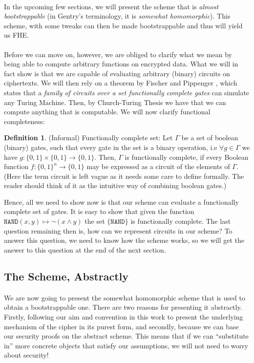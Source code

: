 \documentclass{article}
\theoremstyle{definition}
\newtheorem{definition}{Definition}[section]
\theoremstyle{example}
\newcommand{\NAND}{\texttt{NAND}}
\begin{document}
\paragraph{} In the upcoming few sections, we will present the scheme that is
\textit{almost bootstrappable} (in Gentry's terminology, it is \textit{somewhat
  homomorphic}). This scheme, with some tweaks can then be made bootstrappable
and thus will yield us FHE.
\paragraph{}
Before we can move on, however, we are obliged to
clarify what we mean by being able to compute arbitrary functions on encrypted data.
What we will in fact show is that we are capable of evaluating arbitrary
(binary) circuits on ciphertexts. We will then rely on a theorem by Fischer
and Pippenger \cite{Fischer96lectureson}, which states that a \textit{family of circuits over a set functionally complete gates} can
simulate any Turing Machine. Then, by Church-Turing Thesis we have that we can
compute anything that is computable. We will now clarify functional
completeness:
\begin{definition}{(Informal) Functionally complete set:}
  Let $\Gamma$ be a set of boolean (binary) gates, such that every gate in the set is a
  binary operation, i.e $\forall g \in \Gamma$ we have $g: \{0, 1\} \times \{0,
  1\} \to \{0, 1\}$. Then, $\Gamma$ is functionally complete, if every Boolean
  function $f: \{0, 1\}^n \to \{0, 1\}$ may be expressed as a circuit of
  the elements of $\Gamma$. (Here the term circuit is left vague as it
  needs some care to define formally. The reader should think of it as the
  intuitive way of combining boolean gates.)
\end{definition}
Hence, all we need to show now is that our scheme can evaluate a functionally
complete set of gates. It is easy to show that given the function $\NAND(x, y)
\mapsto \neg (x \land y)$ the set $\{\NAND\}$ is functionally complete. The last
question remaining then is, how can we represent circuits in our scheme? To
answer this question, we need to know how the scheme works, so we will get the
answer to this question at the end of the next section.
\subsection{The Scheme, Abstractly}
\paragraph{} We are now going to present the somewhat homomorphic scheme that is
used to obtain a bootstrappable one. There are two reasons for presenting it
abstractly. Firstly, following our aim and convention in this work to present
the underlying mechanism of the cipher in its purest form, and secondly, because
we can base our security proofs on the abstract scheme. This means that if we
can ``substitute in'' more concrete objects that satisfy our assumptions, we
will not need to worry about security!
\end{document}
